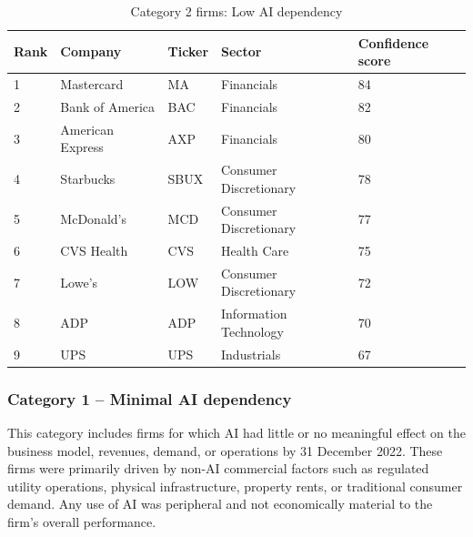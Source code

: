 \documentclass{article}
\begin{document}
\begin{table}[H]
\centering
\caption{Category 2 firms: Low AI dependency}
\small
\renewcommand{\arraystretch}{1.15}
\begin{tabularx}{\textwidth}{@{} C{1.1cm} L{4.2cm} C{1.6cm} L{4.3cm} C{2.3cm} @{}}
\toprule
\textbf{Rank} & \textbf{Company} & \textbf{Ticker} & \textbf{Sector} & \textbf{Confidence score} \\
 & Mastercard & MA & Financials & 84 \\
2 & Bank of America & BAC & Financials & 82 \\
3 & American Express & AXP & Financials & 80 \\
4 & Starbucks & SBUX & Consumer Discretionary & 78 \\
5 & McDonald's & MCD & Consumer Discretionary & 77 \\
6 & CVS Health & CVS & Health Care & 75 \\
7 & Lowe's & LOW & Consumer Discretionary & 72 \\
8 & ADP & ADP & Information Technology & 70 \\
9 & UPS & UPS & Industrials & 67 \\
\bottomrule
\end{tabularx}
\label{tab:category2}
\end{table}

\subsubsection*{Category 1 -- Minimal AI dependency}

This category includes firms for which AI had little or no meaningful effect on the business model, revenues, demand, or operations by 31 December 2022. These firms were primarily driven by non-AI commercial factors such as regulated utility operations, physical infrastructure, property rents, or traditional consumer demand. Any use of AI was peripheral and not economically material to the firm’s overall performance.
\end{document}
